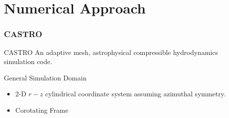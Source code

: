 \documentclass[
	11pt, %
]{beamer}
\begin{document}
\section{Numerical Approach}


\begin{frame}
    \frametitle{CASTRO}
    
    \begin{block}{CASTRO}
    An adaptive mesh, astrophysical compressible hydrodynamics simulation code.
    \end{block}

    \begin{block}{General Simulation Domain}
        \begin{itemize}
            \item 2-D $r-z$ cylindrical coordinate system assuming azimuthal symmetry.
            \item Corotating Frame
        \end{itemize}
    \end{block}
    
\end{frame}
\end{document}
